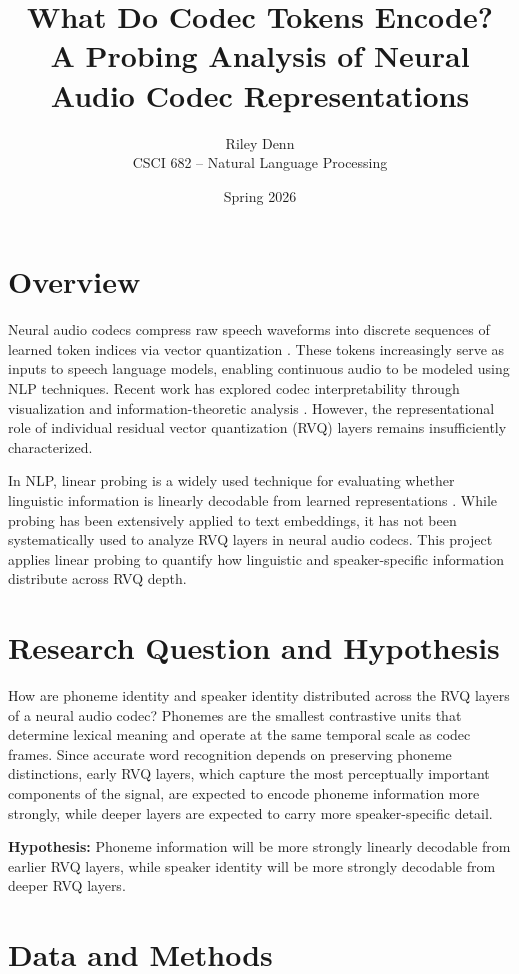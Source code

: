 \documentclass[11pt]{article}
\title{What Do Codec Tokens Encode?\\
A Probing Analysis of Neural Audio Codec Representations}
\author{Riley Denn \\ CSCI 682 -- Natural Language Processing}
\date{Spring 2026}
\begin{document}
\maketitle
\thispagestyle{empty}

\section*{Overview}

Neural audio codecs compress raw speech waveforms into discrete sequences of learned token indices via vector quantization \citep{defossez2022highfidelity}. These tokens increasingly serve as inputs to speech language models, enabling continuous audio to be modeled using NLP techniques. Recent work has explored codec interpretability through visualization and information-theoretic analysis \citep{sadok2025,park2025}. However, the representational role of individual residual vector quantization (RVQ) layers remains insufficiently characterized.

In NLP, linear probing is a widely used technique for evaluating whether linguistic information is linearly decodable from learned representations \citep{belinkov2022probing}. While probing has been extensively applied to text embeddings, it has not been systematically used to analyze RVQ layers in neural audio codecs. This project applies linear probing to quantify how linguistic and speaker-specific information distribute across RVQ depth.

\section*{Research Question and Hypothesis}

How are phoneme identity and speaker identity distributed across the RVQ layers of a neural audio codec? Phonemes are the smallest contrastive units that determine lexical meaning and operate at the same temporal scale as codec frames. Since accurate word recognition depends on preserving phoneme distinctions, early RVQ layers, which capture the most perceptually important components of the signal, are expected to encode phoneme information more strongly, while deeper layers are expected to carry more speaker-specific detail.

\textbf{Hypothesis:} Phoneme information will be more strongly linearly decodable from earlier RVQ layers, while speaker identity will be more strongly decodable from deeper RVQ layers.

\section*{Data and Methods}
\end{document}
